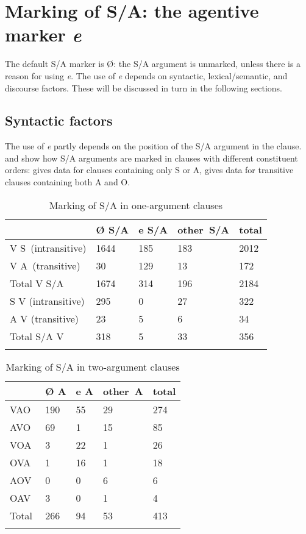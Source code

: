 \section{Marking of S/A: the agentive marker \textit{e}}\label{sec:8.3}

The default S/A marker is Ø: the S/A argument is unmarked, unless there is a reason for using \textit{e}. The use of \textit{e} depends on syntactic, lexical/semantic, and discourse factors. These will be discussed in turn in the following sections.

\subsection[Syntactic factors]{Syntactic factors}\label{sec:8.3.1.1}

The use of \textit{e} partly depends on the position of the S/A argument in the clause.  and  show how S/A arguments are marked in clauses with different constituent orders:  gives data for clauses containing only S or A,  gives data for transitive clauses containing both A and O.

\begin{table}
\begin{tabularx}{\textwidth}{XR{15mm}R{15mm}R{17mm}R{15mm}}
\lsptoprule
 &  { Ø S/A}&  { e S/A}&  { other~S/A}&  { total}\\
\midrule
{V S}~(intransitive) &  1644&  185&  183&  2012\\
{V A}~(transitive) &  30&  129&  13&  172\\
\midrule
{ Total V S/A} &  1674&  314 &  196 &  2184 \\
\tablevspace
{S V} (intransitive) &  295&  0&  27&  322\\
{A V} (transitive) &  23&  5&  6&  34\\
\midrule
{ Total S/A V} &  318&  5 & 33 &  356\\
\lspbottomrule
\end{tabularx}
\caption{Marking of S/A in one-argument clauses}
\label{tab:57}
\end{table}

\begin{table}
\begin{tabularx}{.75\textwidth}{XR{12mm}R{12mm}R{15mm}R{12mm}}
\lsptoprule
 &  { Ø A}&  { e A}&  { other~A}&  { total}\\
\midrule
{ VAO} &  190&  55&  29&  274\\
{ AVO} &  69&  1&  15&  85\\
{ VOA} &  3&  22&  1&  26\\
{ OVA~} &  1&  16&  1&  18\\
{ AOV} &  0&  0&  6&  6\\
{ OAV} &  3&  0&  1&  4\\
\midrule
{ Total} &  266&  94&  53&  413\\
\lspbottomrule
\end{tabularx}
\caption{Marking of S/A in two-argument clauses}
\label{tab:58}
\end{table}

